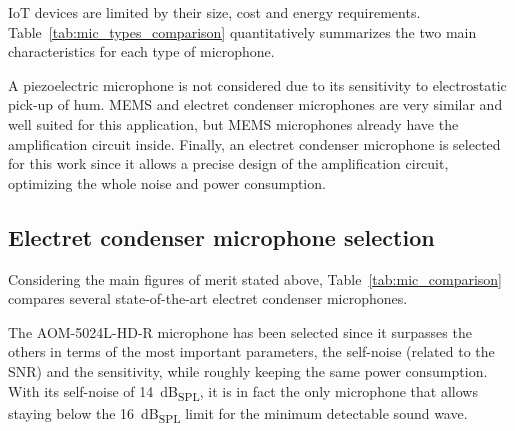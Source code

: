 \documentclass{EPL-master-thesis-covers-EN}
\begin{document}
IoT devices are limited by their size, cost and energy requirements. Table~\ref{tab:mic_types_comparison} quantitatively summarizes the two main characteristics for each type of microphone.

\begin{table}[H]
\centering
{}
\caption{Comparison of several types of microphone}
\label{tab:mic_types_comparison}
\end{table}

A piezoelectric microphone is not considered due to its sensitivity to electrostatic pick-up of hum. MEMS and electret condenser microphones are very similar and well suited for this application, but MEMS microphones already have the amplification circuit inside.
Finally, an electret condenser microphone is selected for this work since it allows a precise design of the amplification circuit, optimizing the whole noise and power consumption.

\subsection*{Electret condenser microphone selection}

Considering the main figures of merit stated above, Table~\ref{tab:mic_comparison} compares several state-of-the-art electret condenser microphones.

The AOM-5024L-HD-R microphone has been selected since it surpasses the others in terms of the most important parameters, the self-noise (related to the SNR) and the sensitivity, while roughly keeping the same power consumption. With its self-noise of \SI{14}{dB_{SPL}}, it is in fact the only microphone that allows staying below the \SI{16}{dB_{SPL}} limit for the minimum detectable sound wave.
\end{document}
